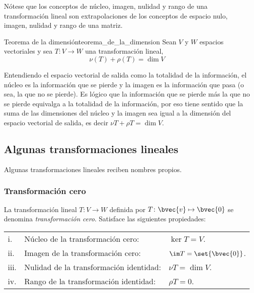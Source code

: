 \documentclass{fmbnotes}
\begin{document}
\begin{tip}
	Nótese que los conceptos de núcleo, imagen, nulidad y rango de una transformación lineal son extrapolaciones de los conceptos de espacio nulo, imagen, nulidad y rango de una matriz.
\end{tip}

\begin{teorema}{Teorema de la dimensión}{teorema_de_la_dimension}
	Sean \(V\) y \(W\) espacios vectoriales y sea \(T:V\to W\) una transformación lineal,
	\[\nu (T) + \rho (T)= \dim V\]
\end{teorema}
Entendiendo el espacio vectorial de salida como la totalidad de la información, el núcleo es la información que se pierde y la imagen es la información que pasa (o sea, la que no se pierde). Es lógico que la información que se pierde más la que no se pierde equivalga a la totalidad de la información, por eso tiene sentido que la suma de las dimensiones del núcleo y la imagen sea igual a la dimensión del espacio vectorial de salida, es decir \(\nu T + \rho T = \dim V\). 

\subsection{Algunas transformaciones lineales}
Algunas transformaciones lineales reciben nombres propios. 

\subsubsection{Transformación cero}
La transformación lineal \(T\colon V\to W\) definida por \(T\colon\bvec{v}\mapsto\bvec{0}\) se denomina \emph{transformación cero}. Satisface las siguientes propiedades:
\begin{longtable}{lp{}p{}}
	\rule[1ex]{0pt}{2.5ex}i.&Núcleo de la transformación cero: &\(\ker T = V\). \\
	\rule[1ex]{0pt}{2.5ex}ii.&Imagen de la transformación cero: &\(\im T = \set{\bvec{0}}\). \\
	\rule[1ex]{0pt}{2.5ex}iii.&Nulidad de la transformación identidad: &\(\nu T = \dim V\). \\
		\rule[1ex]{0pt}{2.5ex}iv.&Rango de la transformación identidad: &\(\rho T = 0\). \\
\end{longtable}
\end{document}

